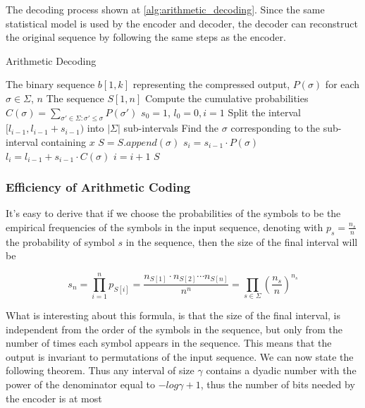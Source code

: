 \noindent The decoding process shown at \ref{alg:arithmetic_decoding}. Since the same statistical model is used by the encoder and decoder, the decoder can reconstruct the original sequence by following the same steps as the encoder.

\begin{algorithm}
    \caption{Arithmetic Decoding} \label{alg:arithmetic_decoding}
    \begin{algorithmic}
        \Require The binary sequence $b[1,k]$ representing the compressed output, $P(\sigma)$ for each $\sigma \in \Sigma$, $n$
        \Ensure The sequence $S[1,n]$
        \State Compute the cumulative probabilities $C(\sigma) = \sum_{\sigma' \in \Sigma: \sigma' \leq \sigma} P(\sigma')$
        \State $s_0 = 1$, $l_0 = 0, i = 1$
        \State Split the interval $[l_{i-1}, l_{i-1} + s_{i-1})$ into $|\Sigma|$ sub-intervals
        \State Find the $\sigma$ corresponding to the sub-interval containing $x$
        \State $S = S.append(\sigma)$
        \State $s_i = s_{i-1} \cdot P(\sigma)$
        \State $l_i = l_{i-1} + s_{i-1} \cdot C(\sigma)$
        \State $i = i + 1$
        \EndWhile
        \State \Return $S$
    \end{algorithmic}
\end{algorithm}

\subsubsection*{Efficiency of Arithmetic Coding}

It's easy to derive that if we choose the probabilities of the symbols to be the empirical frequencies of the symbols in the input sequence, denoting with $p_s = \frac{n_s}{n}$ the probability of symbol $s$ in the sequence, then the size of the final interval will be

\begin{equation}
    s_n = \prod_{i=1}^n p_{S[i]}  = \frac{n_{S[1]} \cdot n_{S[2]} \cdots n_{S[n]}}{n^n} = \prod_{s \in \Sigma} \left (\frac{n_s}{n} \right)^{n_s}
\end{equation}

What is interesting about this formula, is that the size of the final interval, is independent from the order of the symbols in the sequence, but only from the number of times each symbol appears in the sequence. This means that the output is invariant to permutations of the input sequence. We can now state the following theorem. Thus any interval of size $\gamma$ contains a dyadic number with the power of the denominator equal to $-log \gamma + 1$, thus the number of bits needed by the encoder is at most

